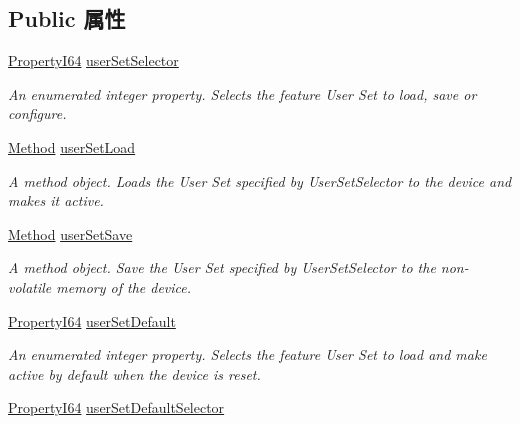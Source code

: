 \subsection*{Public 属性}
\begin{DoxyCompactItemize}
\item 
\hyperlink{group___common_interface_ga81749b2696755513663492664a18a893}{Property\+I64} \hyperlink{classmv_i_m_p_a_c_t_1_1acquire_1_1_gen_i_cam_1_1_user_set_control_a60a24c73faea457a19659ef0e5e41e6c}{user\+Set\+Selector}
\begin{DoxyCompactList}\small\item\em An enumerated integer property. Selects the feature User Set to load, save or configure. \end{DoxyCompactList}\item 
\hyperlink{classmv_i_m_p_a_c_t_1_1acquire_1_1_method}{Method} \hyperlink{classmv_i_m_p_a_c_t_1_1acquire_1_1_gen_i_cam_1_1_user_set_control_a2adba0f27db53c0d63d7b772a41c7219}{user\+Set\+Load}
\begin{DoxyCompactList}\small\item\em A method object. Loads the User Set specified by User\+Set\+Selector to the device and makes it active. \end{DoxyCompactList}\item 
\hyperlink{classmv_i_m_p_a_c_t_1_1acquire_1_1_method}{Method} \hyperlink{classmv_i_m_p_a_c_t_1_1acquire_1_1_gen_i_cam_1_1_user_set_control_a6adfbcf1f208d5ea9940073587642dfe}{user\+Set\+Save}
\begin{DoxyCompactList}\small\item\em A method object. Save the User Set specified by User\+Set\+Selector to the non-\/volatile memory of the device. \end{DoxyCompactList}\item 
\hyperlink{group___common_interface_ga81749b2696755513663492664a18a893}{Property\+I64} \hyperlink{classmv_i_m_p_a_c_t_1_1acquire_1_1_gen_i_cam_1_1_user_set_control_a976dc234c6b9d625d574c137fe732948}{user\+Set\+Default}
\begin{DoxyCompactList}\small\item\em An enumerated integer property. Selects the feature User Set to load and make active by default when the device is reset. \end{DoxyCompactList}\item 
\hyperlink{group___common_interface_ga81749b2696755513663492664a18a893}{Property\+I64} \hyperlink{classmv_i_m_p_a_c_t_1_1acquire_1_1_gen_i_cam_1_1_user_set_control_a08d0aaa8f50249724bf888794adf1713}{user\+Set\+Default\+Selector}

\end{DoxyCompactItemize}
